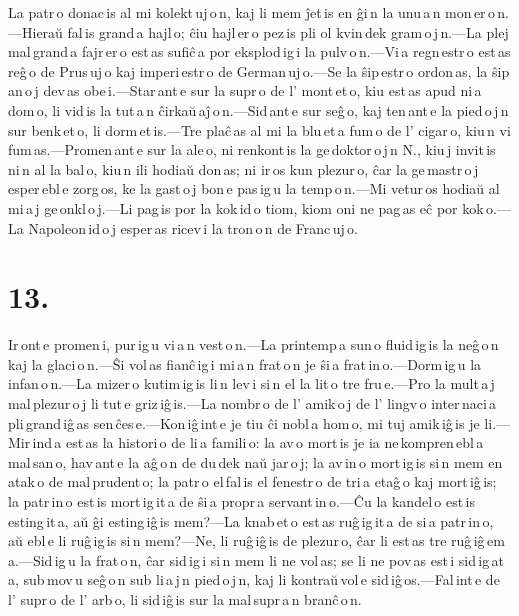 \documentclass[ngerman,12pt,twoside]{book}
\begin{document}
La patr\,o donac\,is al mi kolekt\,uj\,o\,n, kaj li mem ĵet\,is en ĝi\,n la unu\,a\,n mon\,er\,o\,n.---Hieraŭ fal\,is grand\,a hajl\,o; ĉiu hajl\,er\,o pez\,is pli ol kvin\,dek gram\,o\,j\,n.---La plej mal\,grand\,a fajr\,er\,o est\,as sufiĉ\,a por eksplod\,ig\,i la pulv\,o\,n.---Vi\,a regn\,estr\,o est\,as reĝ\,o de Prus\,uj\,o kaj imperi\,estr\,o de German\,uj\,o.---Se la ŝip\,estr\,o ordon\,as, la ŝip\,an\,o\,j dev\,as obe\,i.---Star\,ant\,e sur la supr\,o de l' mont\,et\,o, kiu est\,as apud ni\,a dom\,o, li vid\,is la tut\,a\,n ĉirkaŭ\,aĵ\,o\,n.---Sid\,ant\,e sur seĝ\,o, kaj ten\,ant\,e la pied\,o\,j\,n sur benk\,et\,o, li dorm\,et\,is.---Tre plaĉ\,as al mi la blu\,et\,a fum\,o de l' cigar\,o, kiu\,n vi fum\,as.---Promen\,ant\,e sur la ale\,o, ni renkont\,is la ge\,doktor\,o\,j\,n N., kiu\,j invit\,is ni\,n al la bal\,o, kiu\,n ili hodiaŭ don\,as; ni ir\,os kun plezur\,o, ĉar la ge\,mastr\,o\,j esper\,ebl\,e zorg\,os, ke la gast\,o\,j bon\,e pas\,ig\,u la temp\,o\,n.---Mi vetur\,os hodiaŭ al mi\,a\,j ge\,onkl\,o\,j.---Li pag\,is por la kok\,id\,o tiom, kiom oni ne pag\,as eĉ por kok\,o.---La Napoleon\,id\,o\,j esper\,as ricev\,i la tron\,o\,n de Franc\,uj\,o. 

\section*{13.}

Ir\,ont\,e promen\,i, pur\,ig\,u vi\,a\,n vest\,o\,n.---La printemp\,a sun\,o fluid\,ig\,is la neĝ\,o\,n kaj la glaci\,o\,n.---Ŝi vol\,as fianĉ\,ig\,i mi\,a\,n frat\,o\,n je ŝi\,a frat\,in\,o.---Dorm\,ig\,u la infan\,o\,n.---La mizer\,o kutim\,ig\,is li\,n lev\,i si\,n el la lit\,o tre fru\,e.---Pro la mult\,a\,j mal\,plezur\,o\,j li tut\,e griz\,iĝ\,is.---La nombr\,o de l' amik\,o\,j de l' lingv\,o inter\,naci\,a pli\,grand\,iĝ\,as sen\,ĉes\,e.---Kon\,iĝ\,int\,e je tiu ĉi nobl\,a hom\,o, mi tuj amik\,iĝ\,is je li.---Mir\,ind\,a est\,as la histori\,o de li\,a famili\,o: la av\,o mort\,is je ia ne\,kompren\,ebl\,a mal\,san\,o, hav\,ant\,e la aĝ\,o\,n de du\,dek naŭ jar\,o\,j; la av\,in\,o mort\,ig\,is si\,n mem en atak\,o de mal\,prudent\,o; la patr\,o el\,fal\,is el fenestr\,o de tri\,a etaĝ\,o kaj mort\,iĝ\,is; la patr\,in\,o est\,is mort\,ig\,it\,a de ŝi\,a propr\,a servant\,in\,o.---Ĉu la kandel\,o est\,is esting\,it\,a, aŭ ĝi esting\,iĝ\,is mem?---La knab\,et\,o est\,as ruĝ\,ig\,it\,a de si\,a patr\,in\,o, aŭ ebl\,e li ruĝ\,ig\,is si\,n mem?---Ne, li ruĝ\,iĝ\,is de plezur\,o, ĉar li est\,as tre ruĝ\,iĝ\,em\,a.---Sid\,ig\,u la frat\,o\,n, ĉar sid\,ig\,i si\,n mem li ne vol\,as; se li ne pov\,as est\,i sid\,ig\,at\,a, sub\,mov\,u seĝ\,o\,n sub li\,a\,j\,n pied\,o\,j\,n, kaj li kontraŭ\,vol\,e sid\,iĝ\,os.---Fal\,int\,e de l' supr\,o de l' arb\,o, li sid\,iĝ\,is sur la mal\,supr\,a\,n branĉ\,o\,n. 
\end{document}

